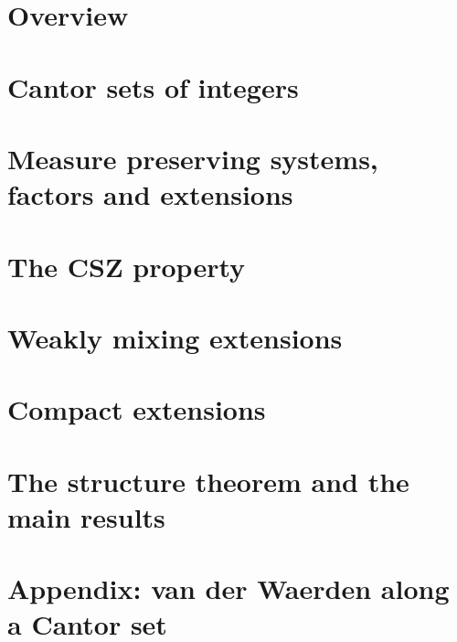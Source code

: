 %
%

\chapter{Overview}
\label{chap:overview}



\chapter{Cantor sets of integers}


\chapter{Measure preserving systems, factors and extensions}


\chapter{The CSZ property}


\chapter{Weakly mixing extensions}


\chapter{Compact extensions}


\chapter{The structure theorem and the main results}


\chapter{Appendix: van der Waerden along a Cantor set}

